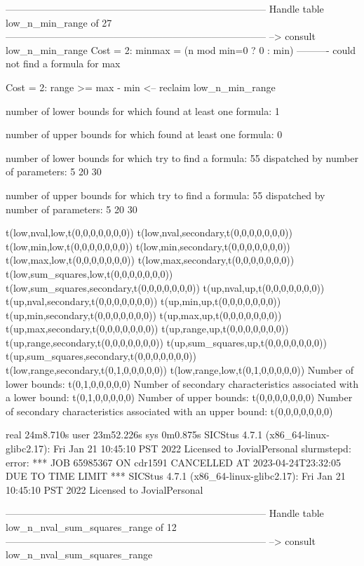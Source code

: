 --------------------------------------------------------------------------------
Handle table low_n_min_range of 27
--------------------------------------------------------------------------------
--> consult low_n_min_range
Cost =  2:  minmax = (n mod min=0 ? 0 : min)
----------
could not find a formula for max

Cost =  2:  range >= max - min
<-- reclaim low_n_min_range

number of lower bounds for which found at least one formula: 1

number of upper bounds for which found at least one formula: 0

number of lower bounds for which try to find a formula: 55
dispatched by number of parameters: 5  20  30

number of upper bounds for which try to find a formula: 55
dispatched by number of parameters: 5  20  30

t(low,nval,low,t(0,0,0,0,0,0,0))
t(low,nval,secondary,t(0,0,0,0,0,0,0))
t(low,min,low,t(0,0,0,0,0,0,0))
t(low,min,secondary,t(0,0,0,0,0,0,0))
t(low,max,low,t(0,0,0,0,0,0,0))
t(low,max,secondary,t(0,0,0,0,0,0,0))
t(low,sum_squares,low,t(0,0,0,0,0,0,0))
t(low,sum_squares,secondary,t(0,0,0,0,0,0,0))
t(up,nval,up,t(0,0,0,0,0,0,0))
t(up,nval,secondary,t(0,0,0,0,0,0,0))
t(up,min,up,t(0,0,0,0,0,0,0))
t(up,min,secondary,t(0,0,0,0,0,0,0))
t(up,max,up,t(0,0,0,0,0,0,0))
t(up,max,secondary,t(0,0,0,0,0,0,0))
t(up,range,up,t(0,0,0,0,0,0,0))
t(up,range,secondary,t(0,0,0,0,0,0,0))
t(up,sum_squares,up,t(0,0,0,0,0,0,0))
t(up,sum_squares,secondary,t(0,0,0,0,0,0,0))
t(low,range,secondary,t(0,1,0,0,0,0,0))
t(low,range,low,t(0,1,0,0,0,0,0))
Number of lower bounds:                                             t(0,1,0,0,0,0,0)
Number of secondary characteristics associated with a lower bound:  t(0,1,0,0,0,0,0)
Number of upper bounds:                                             t(0,0,0,0,0,0,0)
Number of secondary characteristics associated with an upper bound: t(0,0,0,0,0,0,0)

real	24m8.710s
user	23m52.226s
sys	0m0.875s
SICStus 4.7.1 (x86_64-linux-glibc2.17): Fri Jan 21 10:45:10 PST 2022
Licensed to JovialPersonal
slurmstepd: error: *** JOB 65985367 ON cdr1591 CANCELLED AT 2023-04-24T23:32:05 DUE TO TIME LIMIT ***
SICStus 4.7.1 (x86_64-linux-glibc2.17): Fri Jan 21 10:45:10 PST 2022
Licensed to JovialPersonal


--------------------------------------------------------------------------------
Handle table low_n_nval_sum_squares_range of 12
--------------------------------------------------------------------------------
--> consult low_n_nval_sum_squares_range


